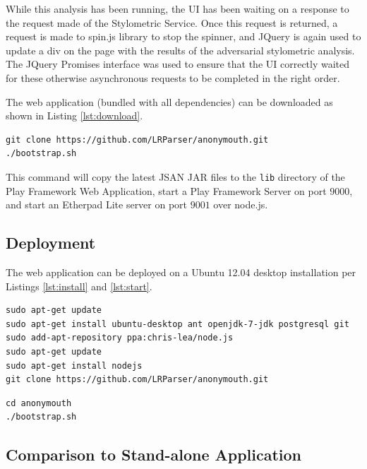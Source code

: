 \documentclass[letterpaper]{article}
\begin{document}
While this analysis has been running, the UI has been waiting on a
response to the request made of the Stylometric Service. Once this
request is returned, a request is made to spin.js library to stop the
spinner, and JQuery is again used to update a div on the page with the
results of the adversarial stylometric analysis. The JQuery Promises
interface was used to ensure that the UI correctly waited for these
otherwise asynchronous requests to be completed in the right order.

The web application (bundled with all dependencies) can be downloaded
as shown in Listing \ref{lst:download}.

\begin{lstlisting}[caption={Download Web Application},label={lst:download}]
git clone https://github.com/LRParser/anonymouth.git
./bootstrap.sh
\end{lstlisting}

This command will copy the latest JSAN JAR files to the \texttt{lib}
directory of the Play Framework Web Application, start a Play
Framework Server on port $9000$, and start an Etherpad Lite server on
port $9001$ over node.js.

\subsection{Deployment}

The web application can be deployed on a Ubuntu 12.04 desktop
installation per Listings \ref{lst:install} and \ref{lst:start}.

\begin{lstlisting}[caption={Install Dependencies},label={lst:install}]
sudo apt-get update
sudo apt-get install ubuntu-desktop ant openjdk-7-jdk postgresql git
sudo add-apt-repository ppa:chris-lea/node.js
sudo apt-get update
sudo apt-get install nodejs
git clone https://github.com/LRParser/anonymouth.git
\end{lstlisting}

\begin{lstlisting}[caption={Start Service},label={lst:start}]
cd anonymouth
./bootstrap.sh
\end{lstlisting}


\subsection{Comparison to Stand-alone Application}
\end{document}

